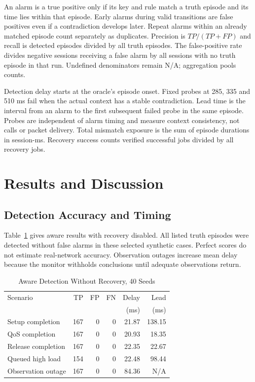 \documentclass[conference]{IEEEtran}
\begin{document}
An alarm is a true positive only if its key and rule match a truth episode and its time lies within that episode. Early alarms during valid transitions are false positives even if a contradiction develops later. Repeat alarms within an already matched episode count separately as duplicates. Precision is $TP/(TP+FP)$ and recall is detected episodes divided by all truth episodes. The false-positive rate divides negative sessions receiving a false alarm by all sessions with no truth episode in that run. Undefined denominators remain N/A; aggregation pools counts.

Detection delay starts at the oracle's episode onset. Fixed probes at 285, 335 and 510 ms fail when the actual context has a stable contradiction. Lead time is the interval from an alarm to the first subsequent failed probe in the same episode. Probes are independent of alarm timing and measure context consistency, not calls or packet delivery. Total mismatch exposure is the sum of episode durations in session-ms. Recovery success counts verified successful jobs divided by all recovery jobs.

\section{Results and Discussion}
\subsection{Detection Accuracy and Timing}
Table~\ref{tab:detection} gives aware results with recovery disabled. All listed truth episodes were detected without false alarms in these selected synthetic cases. Perfect scores do not estimate real-network accuracy. Observation outages increase mean delay because the monitor withholds conclusions until adequate observations return.
\begin{table}[t]
\caption{Aware Detection Without Recovery, 40 Seeds}
\label{tab:detection}\centering\small
\begin{tabular}{lrrrrr}
\toprule Scenario & TP & FP & FN & Delay & Lead\\
 & & & & (ms) & (ms)\\\midrule
Setup completion & 167 & 0 & 0 & 21.87 & 138.15\\
QoS completion & 167 & 0 & 0 & 20.93 & 18.35\\
Release completion & 167 & 0 & 0 & 22.35 & 22.67\\
Queued high load & 154 & 0 & 0 & 22.48 & 98.44\\
Observation outage & 167 & 0 & 0 & 84.36 & N/A\\\bottomrule
\end{tabular}
\end{table}
\end{document}
